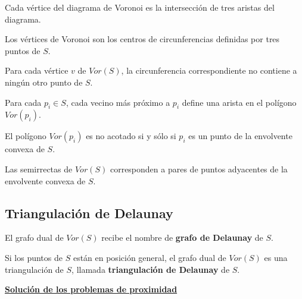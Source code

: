\documentclass[twoside]{report}
\begin{document}
\begin{teorema} Cada vértice del diagrama de Voronoi es la intersección de tres aristas del diagrama.
\end{teorema}

\begin{nota} Los vértices de Voronoi son los centros de
circunferencias definidas por tres puntos de $S$.
\end{nota}


\begin{teorema} Para cada vértice $v$ de $Vor(S)$, la
circunferencia correspondiente no contiene a ningún otro punto de
$S$.
\end{teorema}

\begin{teorema} Para cada $p_i \in S$, cada vecino más
próximo a $p_i$ define una arista en el polígono $Vor(p_i)$.
\end{teorema}

\begin{teorema} El polígono $Vor(p_i)$ es no acotado si y
sólo si $p_i$ es un punto de la envolvente convexa de $S$.
\end{teorema}

\begin{coro} Las semirrectas de $Vor(S)$ corresponden a
pares de puntos adyacentes de la envolvente convexa de $S$.
\end{coro}

\subsection{Triangulación de Delaunay}

\begin{defi} El grafo dual de $Vor(S)$ recibe el nombre de \textbf{grafo de Delaunay} de $S$.
\end{defi}

\begin{teorema} Si los puntos de $S$ están en posición
ge\-ne\-ral, el grafo dual de $Vor(S)$ es una triangulación de
$S$, llamada \textbf{triangulación de Delaunay} de $S$.
\end{teorema}

\textbf{\underline{Solución de los problemas de proximidad}}
\end{document}
